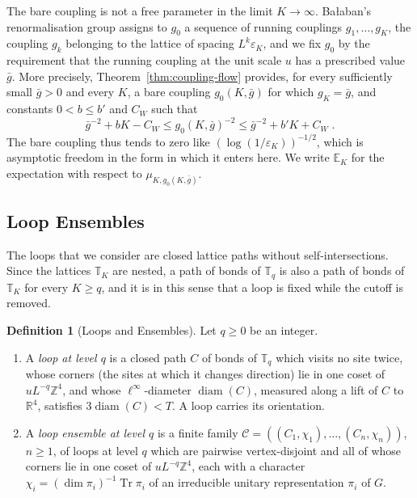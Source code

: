 \documentclass[11pt]{preprint}
\newcommand{\diam}{\operatorname{diam}}
\numberwithin{equation}{section}
\theoremstyle{definition}
\newtheorem{definition}[theorem]{Definition}
\theoremstyle{remark}
\theoremstyle{plain}
\begin{document}
The bare coupling is not a free parameter in the limit $K \to \infty$. Ba{\l}aban's renormalisation group assigns to $g_0$ a sequence of running couplings $g_1, \dots, g_K$, the coupling $g_k$ belonging to the lattice of spacing $L^k\varepsilon_K$, and we fix $g_0$ by the requirement that the running coupling at the unit scale $u$ has a prescribed value $\bar g$. More precisely, Theorem~\ref{thm:coupling-flow} provides, for every sufficiently small $\bar g > 0$ and every $K$, a bare coupling $g_0(K, \bar g)$ for which $g_K = \bar g$, and constants $0 < b \leq b'$ and $C_W$ such that
\begin{equation}\label{eq:bare-coupling-window}
    \bar g^{-2} + bK - C_W \leq g_0(K, \bar g)^{-2} \leq \bar g^{-2} + b'K + C_W\;.
\end{equation}
The bare coupling thus tends to zero like $(\log(1/\varepsilon_K))^{-1/2}$, which is asymptotic freedom in the form in which it enters here. We write $\mathbb E_K$ for the expectation with respect to $\mu_{K,g_0(K,\bar g)}$.

\subsection{Loop Ensembles}\label{sec:loop-ensembles}

The loops that we consider are closed lattice paths without self-intersections. Since the lattices $\mathbb T_K$ are nested, a path of bonds of $\mathbb T_q$ is also a path of bonds of $\mathbb T_K$ for every $K \geq q$, and it is in this sense that a loop is fixed while the cutoff is removed.

\begin{definition}[Loops and Ensembles]\label{def:loop-ensemble}
Let $q \geq 0$ be an integer.
\begin{enumerate}[label=(\roman*)]
\item A \emph{loop at level $q$} is a closed path $C$ of bonds of $\mathbb T_q$ which visits no site twice, whose corners (the sites at which it changes direction) lie in one coset of $uL^{-q}\mathbb Z^4$, and whose $\ell^\infty$-diameter $\diam(C)$, measured along a lift of $C$ to $\mathbb R^4$, satisfies $3\diam(C) < T$. A loop carries its orientation.
\item A \emph{loop ensemble at level $q$} is a finite family $\mathcal C = ((C_1, \chi_1), \dots, (C_n, \chi_n))$, $n \geq 1$, of loops at level $q$ which are pairwise vertex-disjoint and all of whose corners lie in one coset of $uL^{-q}\mathbb Z^4$, each with a character $\chi_i = (\dim\pi_i)^{-1}\operatorname{Tr}\pi_i$ of an irreducible unitary representation $\pi_i$ of $G$.
\end{enumerate}
\end{definition}
\end{document}
